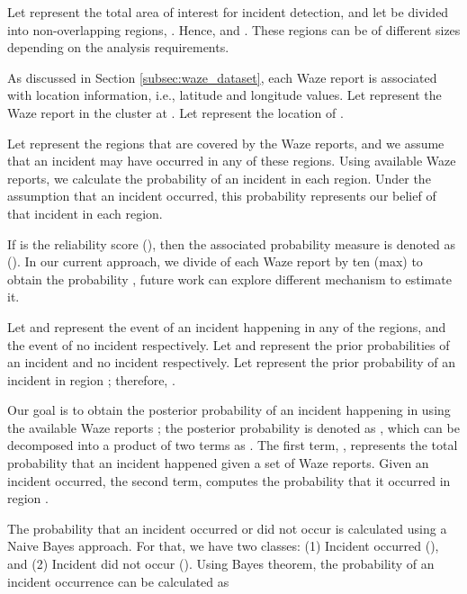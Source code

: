 \documentclass[conference]{IEEEtran}
\begin{document}
Let  represent the total area of interest for incident detection, and let  be divided into  non-overlapping regions, . Hence,  and  . These regions can be of different sizes depending on the analysis requirements.



As discussed in Section \ref{subsec:waze_dataset}, each Waze report is associated with location information, i.e., latitude and longitude values. Let  represent the  Waze report in the  cluster at . Let  represent the location of . 






Let  represent the  regions that are covered by the Waze reports, and we assume that an incident may have occurred in any of these  regions. Using available Waze reports, we calculate the probability of an incident in each region. Under the assumption that an incident occurred, this probability represents our belief of that incident in each region. 

If  is the reliability score (), then the associated probability measure is denoted as  (). 
In our current approach, we divide  of each Waze report by ten (max) to obtain the probability , future work can explore different mechanism to estimate it. 








Let  and  represent the event of an incident happening in any of the  regions, and the event of no incident respectively. Let  and  represent the prior probabilities of an incident and no incident respectively. Let  represent the prior probability of an incident in region ; therefore,  .

Our goal is to obtain the posterior probability of an incident happening in  using the available Waze reports ; the posterior probability is denoted as , which can be decomposed into a product of two terms as . The first term, , represents the total probability that an incident happened given a set of Waze reports. Given an incident occurred, the second term,  computes the probability that it occurred in region .

The probability that an incident occurred or did not occur is calculated using a Naive Bayes approach. For that, we have two classes: (1) Incident occurred (), and (2) Incident did not occur (). Using Bayes theorem, the probability of an incident occurrence can be calculated as
\end{document}
